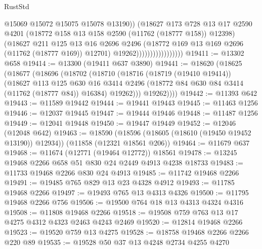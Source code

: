 \begin{lexlean}{RustStd}
\begin{coremodule}
                                      @15069
                                      @15072
                                      @15075
                                      @15078
                                      @13190))
                                  (@18627
                                    @173
                                    @728
                                    @13
                                    @17
                                    @2590
                                    @4201
                                    (@18772 @158 @13 @158 @2590 (@11762 (@18777 @158)) @12398)
                                    (@18627
                                      @211
                                      @125
                                      @13
                                      @16
                                      @2696
                                      @2496
                                      (@18772 @169 @13 @169 @2696 (@11762 (@18777 @169)) @12701)
                                      @19262)))))))))))))))))
@19411 := @13302 @658
@19414 := @13300 (@19411 @637 @3890)
@19441 := @18620
    (@18625
      (@18677
        (@18696
          (@18702
            (@18710
              (@18716
                (@18719 (@19410 @19414))
                (@18627
                  @113
                  @125
                  @630
                  @16
                  @3414
                  @2496
                  (@18772 @84 @630 @84 @3414 (@11762 (@18777 @84)) @16384)
                  @19262)))
            @19262))))
@19442 := @11393 @642
@19443 := @11589 @19442
@19444 := @19441 @19443
@19445 := @11463 @1256
@19446 := @12037 @19445
@19447 := @19444 @19446
@19448 := @11487 @1256
@19449 := @12041 @19448
@19450 := @19447 @19449
@19452 := @12046 (@12048 @642)
@19463 := @18590
    (@18596 (@18605 (@18610 (@19450 @19452 @13190)) @12934))
    (@11858 (@12321 @18561 @206))
@19464 := @11679 @637
@19468 := @11674 (@12771 (@19464 @12772)) @18561
@19478 := @13245 @19468 @2266 @658 @51 @830 @24 @2449 @4913 @4238 @18733
@19483 := @11733 @19468 @2266 @830 @24 @4913
@19485 := @11742 @19468 @2266
@19491 := @19485 @765 @829 @13 @23 @4328 @4912
@19493 := @11785 @19468 @2266
@19497 := @19493 @765 @13 @4313 @4326
@19500 := @11795 @19468 @2266 @756
@19506 := @19500 @764 @18 @13 @4313 @4324 @4316
@19508 := @11808 @19468 @2266
@19518 := @19508 @759 @763 @13 @17 @4275 @4312 @4323 @2463 @4243 @2469
@19520 := @12814 @19468 @2266
@19523 := @19520 @759 @13 @4275
@19528 := @18758 @19468 @2266 @2266 @220 @89
@19535 := @19528 @50 @37 @13 @4248 @2734 @4255 @4270

\end{coremodule}
\end{lexlean}
